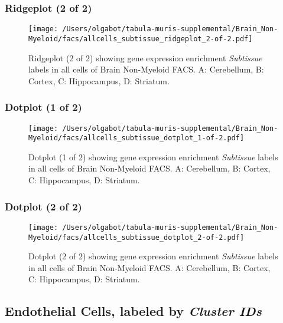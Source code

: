 \clearpage

\subsubsection{Ridgeplot (2 of 2)}
\begin{figure}[h]
\centering
\texttt{[image: /Users/olgabot/tabula-muris-supplemental/Brain\_Non-Myeloid/facs/allcells\_subtissue\_ridgeplot\_2-of-2.pdf]}

\caption{ Ridgeplot (2 of 2)  showing gene expression enrichment \emph{Subtissue} labels in all cells of Brain Non-Myeloid FACS. A: Cerebellum, B: Cortex, C: Hippocampus, D: Striatum.}
\end{figure}


\clearpage

\subsubsection{Dotplot (1 of 2)}
\begin{figure}[h]
\centering
\texttt{[image: /Users/olgabot/tabula-muris-supplemental/Brain\_Non-Myeloid/facs/allcells\_subtissue\_dotplot\_1-of-2.pdf]}

\caption{ Dotplot (1 of 2)  showing gene expression enrichment \emph{Subtissue} labels in all cells of Brain Non-Myeloid FACS. A: Cerebellum, B: Cortex, C: Hippocampus, D: Striatum.}
\end{figure}


\clearpage

\subsubsection{Dotplot (2 of 2)}
\begin{figure}[h]
\centering
\texttt{[image: /Users/olgabot/tabula-muris-supplemental/Brain\_Non-Myeloid/facs/allcells\_subtissue\_dotplot\_2-of-2.pdf]}

\caption{ Dotplot (2 of 2)  showing gene expression enrichment \emph{Subtissue} labels in all cells of Brain Non-Myeloid FACS. A: Cerebellum, B: Cortex, C: Hippocampus, D: Striatum.}
\end{figure}


\clearpage

\subsection{Endothelial Cells, labeled by \emph{Cluster IDs}}
